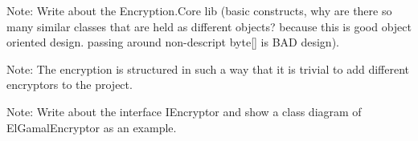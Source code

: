 Note: Write about the Encryption.Core lib (basic constructs, why are there so many similar classes that are held
as different objects? because this is good object oriented design. passing around non-descript byte[] is BAD design).

Note: The encryption is structured in such a way that it is trivial to add different encryptors to the project.

Note: Write about the interface IEncryptor and show a class diagram of ElGamalEncryptor as an example.